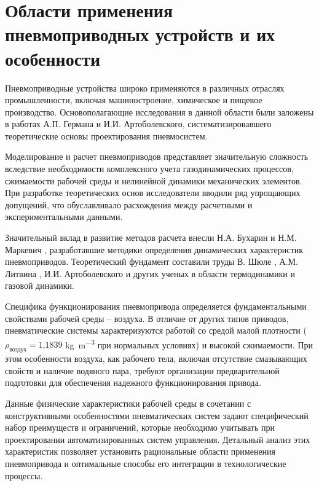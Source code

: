 
\section{Области применения пневмоприводных устройств и их особенности}\label{sec:ch1/sec1}

Пневмоприводные устройства широко применяются в различных отраслях промышленности, включая машиностроение,
химическое и пищевое производство. Основополагающие исследования в данной области были заложены в работах А.П.
Германа \cite*{german:a} и И.И. Артоболевского, систематизировавшего теоретические основы проектирования пневмосистем.

Моделирование и расчет пневмоприводов представляет значительную сложность вследствие необходимости комплексного учета
газодинамических процессов, сжимаемости рабочей среды и нелинейной динамики механических элементов. При разработке
теоретических основ исследователи вводили ряд упрощающих допущений, что обуславливало расхождения между расчетными
и экспериментальными данными.

Значительный вклад в развитие методов расчета внесли Н.А. Бухарин \cite*{бухарин} и Н.М. Маркевич \cite*{маркевич},
разработавшие методики определения динамических характеристик пневмоприводов. Теоретический фундамент составили
труды В. Шюле \cite*{шюле:техническая_термодинамика}, А.М. Литвина \cite*{литвин:техническая_термодинамика}, И.И. Артоболевского
\cite*{артболевский:теория_механизмов_машин} и других ученых в области термодинамики и газовой динамики.

Специфика функционирования пневмопривода определяется фундаментальными свойствами рабочей среды -- воздуха.
В отличие от других типов приводов, пневматические системы характеризуются работой со средой малой плотности
($\rho_{\text{воздух}} = \text{1,1839}$ \si{\kilogram\per\cubic\metre} при нормальных условиях)
и высокой сжимаемости. При этом особенности воздуха, как рабочего тела, включая отсутствие смазывающих свойств
и наличие водяного пара, требуют организации предварительной подготовки для обеспечения надежного функционирования привода.

Данные физические характеристики рабочей среды в сочетании с конструктивными особенностями пневматических
систем задают специфический набор преимуществ и ограничений, которые необходимо учитывать при проектировании
автоматизированных систем управления.
Детальный анализ этих характеристик позволяет установить рациональные области применения пневмопривода
и оптимальные способы его интеграции в технологические процессы.

